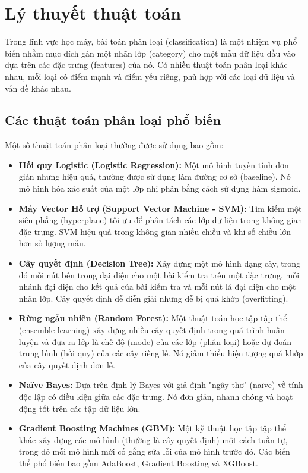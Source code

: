 \section{Lý thuyết thuật toán}

Trong lĩnh vực học máy, bài toán phân loại (classification) là một nhiệm vụ phổ biến nhằm mục đích gán một nhãn lớp (category) cho một mẫu dữ liệu đầu vào dựa trên các đặc trưng (features) của nó. Có nhiều thuật toán phân loại khác nhau, mỗi loại có điểm mạnh và điểm yếu riêng, phù hợp với các loại dữ liệu và vấn đề khác nhau.

\subsection{Các thuật toán phân loại phổ biến}
Một số thuật toán phân loại thường được sử dụng bao gồm:
\begin{itemize}
    \item \textbf{Hồi quy Logistic (Logistic Regression):} Một mô hình tuyến tính đơn giản nhưng hiệu quả, thường được sử dụng làm đường cơ sở (baseline). Nó mô hình hóa xác suất của một lớp nhị phân bằng cách sử dụng hàm sigmoid.
    \item \textbf{Máy Vector Hỗ trợ (Support Vector Machine - SVM):} Tìm kiếm một siêu phẳng (hyperplane) tối ưu để phân tách các lớp dữ liệu trong không gian đặc trưng. SVM hiệu quả trong không gian nhiều chiều và khi số chiều lớn hơn số lượng mẫu.
    \item \textbf{Cây quyết định (Decision Tree):} Xây dựng một mô hình dạng cây, trong đó mỗi nút bên trong đại diện cho một bài kiểm tra trên một đặc trưng, mỗi nhánh đại diện cho kết quả của bài kiểm tra và mỗi nút lá đại diện cho một nhãn lớp. Cây quyết định dễ diễn giải nhưng dễ bị quá khớp (overfitting).
    \item \textbf{Rừng ngẫu nhiên (Random Forest):} Một thuật toán học tập tập thể (ensemble learning) xây dựng nhiều cây quyết định trong quá trình huấn luyện và đưa ra lớp là chế độ (mode) của các lớp (phân loại) hoặc dự đoán trung bình (hồi quy) của các cây riêng lẻ. Nó giảm thiểu hiện tượng quá khớp của cây quyết định đơn lẻ.
    \item \textbf{Naïve Bayes:} Dựa trên định lý Bayes với giả định "ngây thơ" (naïve) về tính độc lập có điều kiện giữa các đặc trưng. Nó đơn giản, nhanh chóng và hoạt động tốt trên các tập dữ liệu lớn.
    \item \textbf{Gradient Boosting Machines (GBM):} Một kỹ thuật học tập tập thể khác xây dựng các mô hình (thường là cây quyết định) một cách tuần tự, trong đó mỗi mô hình mới cố gắng sửa lỗi của mô hình trước đó. Các biến thể phổ biến bao gồm AdaBoost, Gradient Boosting và XGBoost.
\end{itemize}

